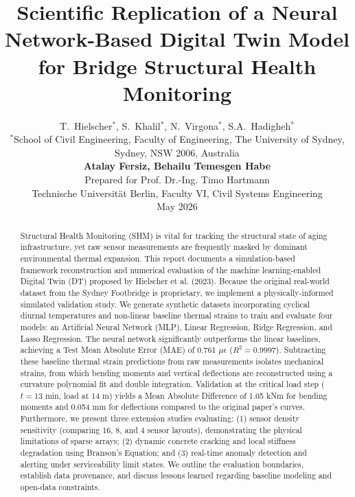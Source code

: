 \documentclass[11pt,journal,onecolumn]{IEEEtran}
\begin{document}
\linenumbers

\title{Scientific Replication of a Neural Network-Based Digital Twin Model for Bridge Structural Health Monitoring}

\author{
    T.~Hielscher$^*$, S.~Khalil$^*$, N.~Virgona$^*$, S.A.~Hadigheh$^*$ \\
    \small $^*$School of Civil Engineering, Faculty of Engineering, The University of Sydney, Sydney, NSW 2006, Australia \\
    \vspace{1.5cm}
    \textbf{Atalay Fersiz, Behailu Temesgen Habe} \\
    Prepared for Prof. Dr.-Ing. Timo Hartmann \\
    Technische Universit\"{a}t Berlin, Faculty VI, Civil Systems Engineering \\
    May 2026
}

\maketitle

\begin{abstract}
Structural Health Monitoring (SHM) is vital for tracking the structural state of aging infrastructure, yet raw sensor measurements are frequently masked by dominant environmental thermal expansion. This report documents a simulation-based framework reconstruction and numerical evaluation of the machine learning-enabled Digital Twin (DT) proposed by Hielscher et al. (2023). Because the original real-world dataset from the Sydney Footbridge is proprietary, we implement a physically-informed simulated validation study. We generate synthetic datasets incorporating cyclical diurnal temperatures and non-linear baseline thermal strains to train and evaluate four models: an Artificial Neural Network (MLP), Linear Regression, Ridge Regression, and Lasso Regression. The neural network significantly outperforms the linear baselines, achieving a Test Mean Absolute Error (MAE) of 0.761 $\mu\epsilon$ ($R^2 = 0.9997$). Subtracting these baseline thermal strain predictions from raw measurements isolates mechanical strains, from which bending moments and vertical deflections are reconstructed using a curvature polynomial fit and double integration. Validation at the critical load step ($t=13$ min, load at 14 m) yields a Mean Absolute Difference of 1.05 kNm for bending moments and 0.054 mm for deflections compared to the original paper's curves. Furthermore, we present three extension studies evaluating: (1) sensor density sensitivity (comparing 16, 8, and 4 sensor layouts), demonstrating the physical limitations of sparse arrays; (2) dynamic concrete cracking and local stiffness degradation using Branson's Equation; and (3) real-time anomaly detection and alerting under serviceability limit states. We outline the evaluation boundaries, establish data provenance, and discuss lessons learned regarding baseline modeling and open-data constraints.
\end{abstract}
\end{document}
